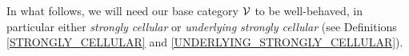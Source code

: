 \documentclass[a4paper,10pt]{article}%
\begin{document}

In what follows, we will need our base category $\mathcal V$ to be well-behaved, in particular either \textit{strongly cellular} or \textit{underlying strongly cellular} (see Definitions \ref{STRONGLY_CELLULAR} and \ref{UNDERLYING_STRONGLY_CELLULAR}).




  
\end{document}
